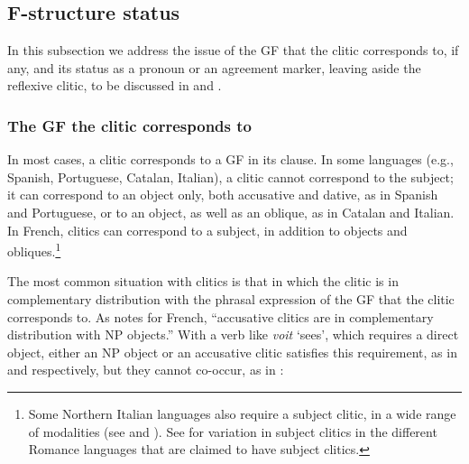 \documentclass[output=paper,hidelinks]{langscibook}
\begin{document}
\subsection{F-structure status}
\label{sec:Romance:2.2}

In this subsection we address the issue of the GF that the clitic corresponds to, if any, and its status as a pronoun or an agreement marker, leaving aside the reflexive clitic, to be discussed in  and .

\subsubsection{The GF the clitic corresponds to}
\label{sec:Romance:2.2.1}

In most cases, a clitic corresponds to a GF in its clause. In some languages (e.g., Spanish, Portuguese, Catalan, Italian), a clitic cannot correspond to the subject; it can correspond to an object only, both accusative and dative, as in Spanish and Portuguese, or to an object, as well as an oblique, as in Catalan and Italian. In French, clitics can correspond to a subject, in addition to objects and obliques.\footnote{Some Northern Italian languages also require a subject clitic, in a wide range of modalities (see \citealt{RenziVanelli1983} and \citealt{CardinalettiRepetti2010}). See \citet{PolettoTortora2016} for variation in subject clitics in the different Romance languages that are claimed to have subject clitics.}

The most common situation with clitics is that in which the clitic is in complementary distribution with the phrasal expression of the GF that the clitic corresponds to. As \citet[88]{Grimshaw1982} notes for French, ``accusative clitics are in complementary distribution with NP objects.'' With a verb like \textit{voit} `sees', which requires a direct object, either an NP object or an accusative clitic satisfies this requirement, as in  and  respectively, but they cannot co-occur, as in :
\end{document}
